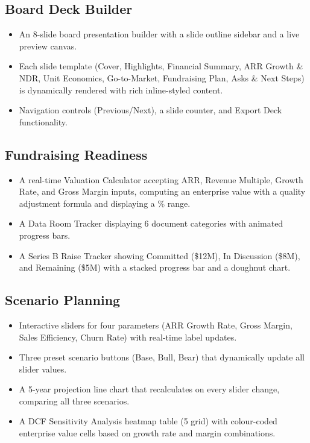 \documentclass{book}
\begin{document}
\subsection{Board Deck Builder}
\begin{itemize}
    \item An 8-slide board presentation builder with a slide outline sidebar and a live preview canvas.
    \item Each slide template (Cover, Highlights, Financial Summary, ARR Growth \& NDR, Unit Economics, Go-to-Market, Fundraising Plan, Asks \& Next Steps) is dynamically rendered with rich inline-styled content.
    \item Navigation controls (Previous/Next), a slide counter, and Export Deck functionality.
\end{itemize}

\subsection{Fundraising Readiness}
\begin{itemize}
    \item A real-time Valuation Calculator accepting ARR, Revenue Multiple, Growth Rate, and Gross Margin inputs, computing an enterprise value with a quality adjustment formula and displaying a \% range.
    \item A Data Room Tracker displaying 6 document categories with animated progress bars.
    \item A Series B Raise Tracker showing Committed (\$12M), In Discussion (\$8M), and Remaining (\$5M) with a stacked progress bar and a doughnut chart.
\end{itemize}

\subsection{Scenario Planning}
\begin{itemize}
    \item Interactive sliders for four parameters (ARR Growth Rate, Gross Margin, Sales Efficiency, Churn Rate) with real-time label updates.
    \item Three preset scenario buttons (Base, Bull, Bear) that dynamically update all slider values.
    \item A 5-year projection line chart that recalculates on every slider change, comparing all three scenarios.
    \item A DCF Sensitivity Analysis heatmap table (5 grid) with colour-coded enterprise value cells based on growth rate and margin combinations.
\end{itemize}
\end{document}
